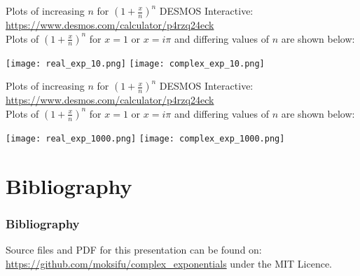 \documentclass{beamer}
\begin{document}
\begin{frame}
  \begin{block}{Plots of increasing $n$ for $(1 + \frac{x}{n})^n$}
  DESMOS Interactive: \url{https://www.desmos.com/calculator/p4rzq24eck}\\
  Plots of $(1+\frac{x}{n})^n$ for $x = 1$ or $x=i\pi$ and differing values of $n$ are shown below:
  \end{block}
  \begin{minipage}{\textwidth}
    \texttt{[image: real\_exp\_10.png]}
    \texttt{[image: complex\_exp\_10.png]}
  \end{minipage}
\end{frame}

\begin{frame}
  \begin{block}{Plots of increasing $n$ for $(1 + \frac{x}{n})^n$}
  DESMOS Interactive: \url{https://www.desmos.com/calculator/p4rzq24eck}\\
  Plots of $(1+\frac{x}{n})^n$ for $x = 1$ or $x=i\pi$ and differing values of $n$ are shown below:
  \end{block}
  \begin{minipage}{\textwidth}
    \texttt{[image: real\_exp\_1000.png]}
    \texttt{[image: complex\_exp\_1000.png]}
  \end{minipage}
\end{frame}

\section{Bibliography}
\begin{frame}
  \frametitle{Bibliography}
  \printbibliography

  Source files and PDF for this presentation can be found on:
  \url{https://github.com/moksifu/complex_exponentials}
  under the MIT Licence.
\end{frame}


\end{document}
